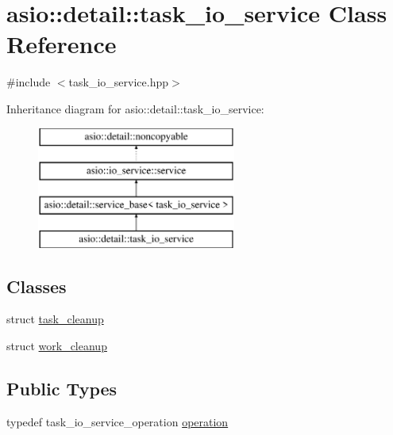 \hypertarget{classasio_1_1detail_1_1task__io__service}{}\section{asio\+:\+:detail\+:\+:task\+\_\+io\+\_\+service Class Reference}
\label{classasio_1_1detail_1_1task__io__service}


{\ttfamily \#include $<$task\+\_\+io\+\_\+service.\+hpp$>$}

Inheritance diagram for asio\+:\+:detail\+:\+:task\+\_\+io\+\_\+service\+:\begin{figure}[H]
\begin{center}
\leavevmode
\includegraphics[height=4.000000cm]{classasio_1_1detail_1_1task__io__service}
\end{center}
\end{figure}
\subsection*{Classes}
\begin{DoxyCompactItemize}
\item 
struct \hyperlink{structasio_1_1detail_1_1task__io__service_1_1task__cleanup}{task\+\_\+cleanup}
\item 
struct \hyperlink{structasio_1_1detail_1_1task__io__service_1_1work__cleanup}{work\+\_\+cleanup}
\end{DoxyCompactItemize}
\subsection*{Public Types}
\begin{DoxyCompactItemize}
\item 
typedef task\+\_\+io\+\_\+service\+\_\+operation \hyperlink{classasio_1_1detail_1_1task__io__service_abb8a2a1b24b3cbf9afd8d19bf4bd6929}{operation}
\end{DoxyCompactItemize}
